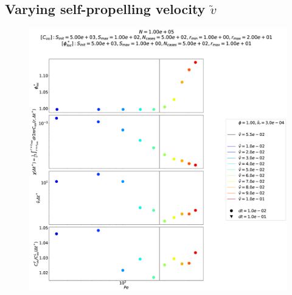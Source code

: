 \documentclass[class=report, float=false, crop=false]{standalone}
\begin{document}
\newpage
\subsection{Varying self-propelling velocity $\tilde{v}$}

\begin{figure}[h!]
\centering
\includegraphics[width=\textwidth]{figures/figs/comparison_Dl1000_Rh3000_drdt.eps}
\caption{}
\label{comparison_Dl1000_Rh3000}
\end{figure}
\end{document}
